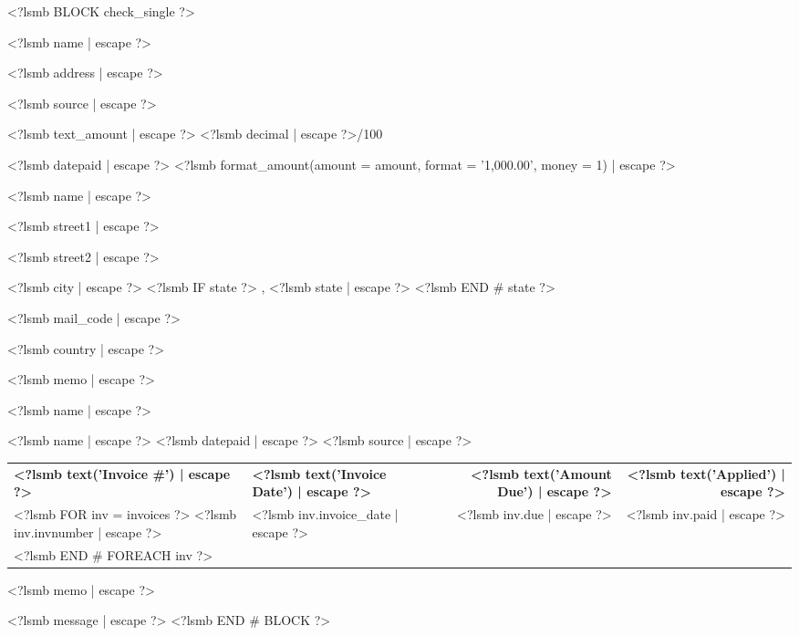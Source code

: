 <?lsmb BLOCK check_single ?>
\parbox[t]{12cm}{
  <?lsmb name | escape ?>

  <?lsmb address | escape ?>}
\hfill
\parbox[t]{6cm}{\hfill <?lsmb source | escape ?>}

\vspace*{0.6cm}

<?lsmb text_amount | escape ?> \dotfill <?lsmb decimal | escape ?>/100 \makebox[0.5cm]{\hfill}

\vspace{0.5cm}

\hfill <?lsmb datepaid | escape ?> \makebox[2cm]{\hfill} <?lsmb 
format_amount({amount = amount, format = '1,000.00', money = 1}) | escape ?>


\vspace{0.5cm}

<?lsmb name | escape ?>

<?lsmb street1 | escape ?>

<?lsmb street2 | escape ?>

<?lsmb city | escape ?>
<?lsmb IF state ?>
\hspace{-0.1cm}, <?lsmb state | escape ?>
<?lsmb END # state ?>

<?lsmb mail_code | escape ?>

<?lsmb country | escape ?>

\vspace{1.8cm}

<?lsmb memo | escape ?>

\vspace{0.8cm}

<?lsmb name | escape ?>

\vspace{0.5cm}

<?lsmb name | escape ?> \hfill <?lsmb datepaid | escape ?> \hfill <?lsmb source | escape ?>

\vspace{0.5cm}
\begin{tabularx}{\textwidth}{lXrr@{}}
\textbf{<?lsmb text('Invoice #') | escape ?>} & \textbf{<?lsmb text('Invoice Date') | escape ?>}
  & \textbf{<?lsmb text('Amount Due') | escape ?>} & \textbf{<?lsmb text('Applied') | escape ?>} \\
<?lsmb FOR inv = invoices ?>
<?lsmb inv.invnumber | escape ?> & <?lsmb inv.invoice_date | escape ?> \dotfill
  & <?lsmb inv.due | escape ?> & <?lsmb inv.paid | escape ?> \\
<?lsmb END # FOREACH inv ?>
\end{tabularx}

\vspace{1cm}

<?lsmb memo | escape ?>

\vfill
<?lsmb message | escape ?>
<?lsmb END # BLOCK ?>
